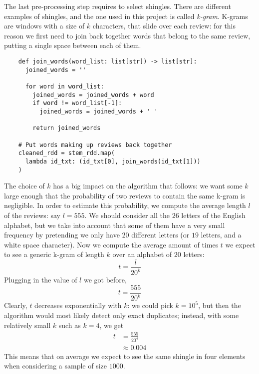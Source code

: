 \documentclass{article}
\begin{document}
  The last pre-processing step requires to select shingles. There are different
  examples of shingles, and the one used in this project is called
  \textit{k-gram}. K-grams are windows with a size of \( k \) characters, that
  slide over each review: for this reason we first need to join back together
  words that belong to the same review, putting a single space between each of
  them. \\
  \begin{verbatim}
    def join_words(word_list: list[str]) -> list[str]:
      joined_words = ''

      for word in word_list:
        joined_words = joined_words + word
        if word != word_list[-1]:
          joined_words = joined_words + ' '

        return joined_words

    # Put words making up reviews back together
    cleaned_rdd = stem_rdd.map(
      lambda id_txt: (id_txt[0], join_words(id_txt[1]))
    )
  \end{verbatim}
  The choice of \( k \) has a big impact on the algorithm that follows: we want
  some \( k \) large enough that the probability of two reviews to contain the
  same k-gram is negligible. In order to estimate this probability, we compute
  the average length \( l \) of the reviews: say \( l = 555 \). We should
  consider all the \( 26 \) letters of the English alphabet, but we take into
  account that some of them have a very small frequency by pretending we only
  have \( 20 \) different letters (or \( 19 \) letters, and a white space
  character). Now we compute the average amount of times \( t \) we expect to
  see a generic k-gram of length \( k \) over an alphabet of \( 20 \) letters:
  \[
    t = \frac{ l }{ { 20 }^k }
  \]
  Plugging in the value of \( l \) we got before,
  \[
    t = \frac{ 555 }{ { 20 }^k }
  \]
  Clearly, \( t \) decreases exponentially with \( k \): we could pick
  \( k = { 10 }^5 \), but then the algorithm would most likely detect only
  exact duplicates; instead, with some relatively small \( k \) such as
  \( k = 4 \), we get
  \begin{align*}
    t
    & = \frac{ 555 }{ { 20 }^4 } \\
    & \approx 0.004
  \end{align*}
  This means that on average we expect to see the same shingle in four elements
  when considering a sample of size \( 1000 \). \\
\end{document}
